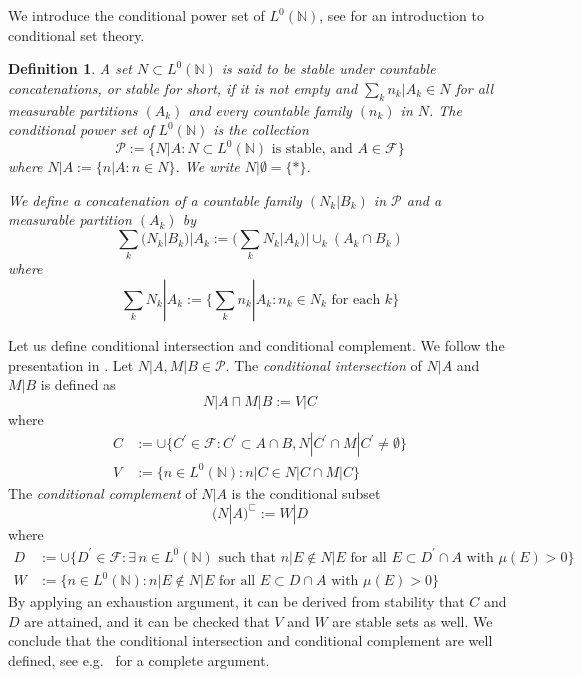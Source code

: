 \documentclass{jloganal}
\numberwithin{equation}{section}
\theoremstyle{plain}
\newtheorem{definition}[subsection]{Definition}
\newcommand\N{\mathbb{N}}
\newcommand\F{\mathcal{F}}
\begin{document}
We introduce the conditional power set of $L^0(\mathbb{N})$, see \cite{drapeau2016algebra} for an introduction to conditional set theory. 
\begin{definition} 
A set $N \subset L^0(\mathbb{N})$ is said to be \emph{stable under countable concatenations}, or \emph{stable} for short,  if 
it is not empty and 
$\sum_k n_k|A_k\in N$ for all measurable partitions $(A_k)$ and every countable family $(n_k)$ in $N$. 
The \emph{conditional power set} of $L^0(\N)$ is the collection
\[
\mathcal{P}:=\{N|A\colon N \subset L^0(\mathbb{N}) \text{ is stable, and  }A\in \F\} 
\]
where $N|A:=\{n|A\colon n\in N\}$.  
We write $N|\emptyset=\{\ast\}$.  

We define a concatenation of a countable family $(N_k|B_k)$ in $\mathcal{P}$ and a measurable partition $(A_k)$ by 
\[
\sum_k (N_k|B_k)|A_k:=\Bigg(\sum_k N_k|A_k\Bigg)|\cup_k (A_k\cap B_k)
\]
where 
\[
\sum_k N_k|A_k:=\Bigg\{\sum_k n_k|A_k\colon n_k\in N_k \text{ for each }k\Bigg\} 
\]
\end{definition}
Let us define conditional intersection and conditional complement. 
We follow the presentation in \cite[Section 2]{jamneshan2017measures}.  
Let $N|A,M|B\in \mathcal{P}$.  
The \emph{conditional intersection} of $N|A$ and $M|B$ is defined as 
\begin{equation}\label{eq:intersection}
N|A\sqcap M|B:=V|C 
\end{equation}
where 
\begin{align*}
C&:= \cup\{C^\prime\in \F\colon C^\prime\subset A\cap B, N|C^\prime\cap M|C^\prime\neq \emptyset\}\\
V&:=\{n\in L^0(\N)\colon n|C\in N|C\cap M|C\} 
\end{align*}
The \emph{conditional complement} of $N|A$ is the conditional subset
\begin{equation}\label{eq:complement}
(N|A)^\sqsubset:=W|D
\end{equation}
where 
\begin{align*}
D&:= \cup\{D^\prime\in \F\colon \exists\, n\in L^0(\N) \text{ such that } n|E\not\in N|E \text{ for all } E\subset D^\prime \cap A \text{ with } \mu(E)>0\}\\ 
W&:=\{n\in L^0(\N)\colon n|E\not\in N|E \text{ for all } E\subset D \cap A \text{ with } \mu(E)>0\}
\end{align*}
By applying an exhaustion argument, it can be derived from stability that $C$ and $D$ are attained, and it can 
be checked that $V$ and $W$ are stable sets as well.  We conclude that the conditional intersection and conditional complement are well defined,  see e.g.~\cite{jamneshan2017measures} for a complete argument.  
\end{document}
